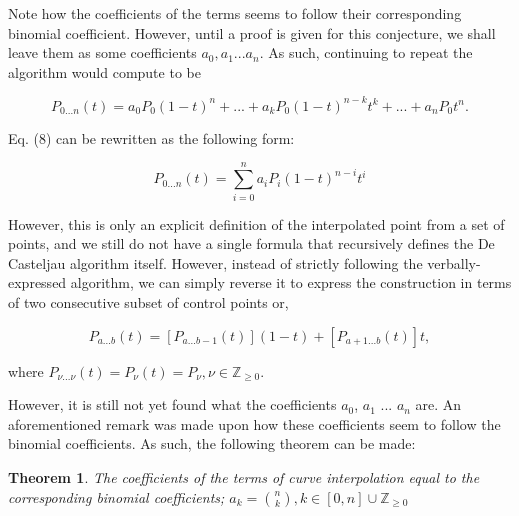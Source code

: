 \documentclass[12pt, oneside]{article}   	%
\newtheorem{theorem}{Theorem}
\numberwithin{figure}{section}
\begin{document}
Note how the coefficients of the terms seems to follow their corresponding binomial coefficient. However, until a proof is given for this conjecture, we shall leave them as some coefficients \(a_0, a_1 ... a_n\). As such, continuing to repeat the algorithm would compute to be

\begin{equation}
P_{0...n}(t)=a_{0}P_0(1-t)^n+ ... + a_{k}P_0(1-t)^{n-k}t^k + ... + a_{n}P_0t^n.
\end{equation}

Eq. (8) can be rewritten as the following form:

\begin{equation}
P_{0...n}(t)=\displaystyle\sum_{i=0}^{n} a_{i}P_i(1-t)^{n-i}t^i
\end{equation}

However, this is only an explicit definition of the interpolated point from a set of points, and we still do not have a single formula that recursively defines the De Casteljau algorithm itself. However, instead of strictly following the verbally-expressed algorithm, we can simply reverse it to express the construction in terms of two consecutive subset of control points or,

\begin{equation}
P_{a...b}(t)=[P_{a...b-1}(t)](1-t)+[P_{a+1...b}(t)]t,
\end{equation}

where \(P_{\nu...\nu}(t)=P_{\nu}(t)=P_{\nu}, \nu \in \mathbb{Z}_{\geq0}\).

However, it is still not yet found what the coefficients \(a_0\), \(a_1\) ... \(a_n\) are. An aforementioned remark was made upon how these coefficients seem to follow the binomial coefficients. As such, the following theorem can be made:
\newline
\begin{theorem} 
The coefficients of the terms of curve interpolation equal to the corresponding binomial coefficients; \(a_k=\binom{n}{k}, k \in [0,n] \cup \mathbb{Z}_{\geq0} \)
\end{theorem}
\end{document}

